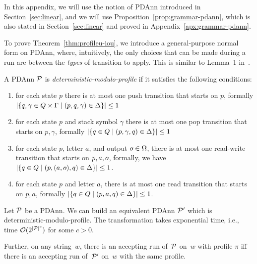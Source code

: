 In this appendix, we will use the notion of PDAnn introduced in
Section~\ref{sec:linear}, and we will use 
Proposition~\ref{prop:grammar-pdann}, which is also stated in
Section~\ref{sec:linear} and proved in
Appendix~\ref{apx:grammar-pdann}.

%

%
%
%
%
%
%
%
%
%
%
%
%

To prove Theorem~\ref{thm:profileu-iou}, we introduce a general-purpose normal form on PDAnn, where,
intuitively, the only choices that can be made during a run are between the \emph{types}
of transition to apply. This is similar to Lemma~1 in~\cite{icdt2020nested}.

\begin{definition}
  A PDAnn $\mathcal{P}$ is \emph{deterministic-modulo-profile} if it satisfies the following conditions:

  \begin{enumerate}
    \item for each state $p$ there is at most one push transition that
      starts on $p$, formally $\left|\{q, \gamma \in Q \times \Gamma \mid
      (p, q, \gamma) \in \Delta\}\right| \leq 1$
    \item for each state $p$ and stack symbol $\gamma$ there is at most
      one pop transition that starts on $p,\gamma$, formally $\left|\{q
      \in Q \mid (p, \gamma, q) \in \Delta\}\right| \leq 1$
    \item for each state $p$, letter $a$, and output $\oout \in \Omega$, there is at most one read-write transition that starts on
      $p,a,\oout$, formally, we have $\card{\{q \in Q \mid (p,(a,\oout),q) \in \Delta\}}
      \leq 1$.
      \item for each state $p$ and letter $a$, there is at most one read transition that starts on
      $p,a$, formally $\left|\{q \in Q \mid (p,a,q) \in \Delta\}\right|
      \leq 1$.
  \end{enumerate}
\end{definition}

\begin{lemma}\label{lem:pdtonechoice}
        Let $\mathcal{P}$ be a PDAnn. We can build an equivalent PDAnn $\mathcal{P}'$ which is
        deterministic-modulo-profile. The transformation takes exponential time,
        i.e., time $\mathcal{O}(2^{|\mathcal{P}|^c})$ for some $c > 0$.

        Further, on any string~$w$, there is an accepting run of~$\mathcal{P}$ on~$w$ with
        profile $\pi$ iff there is an accepting run of~$\mathcal{P}'$ on~$w$ with the same profile.
\end{lemma}

